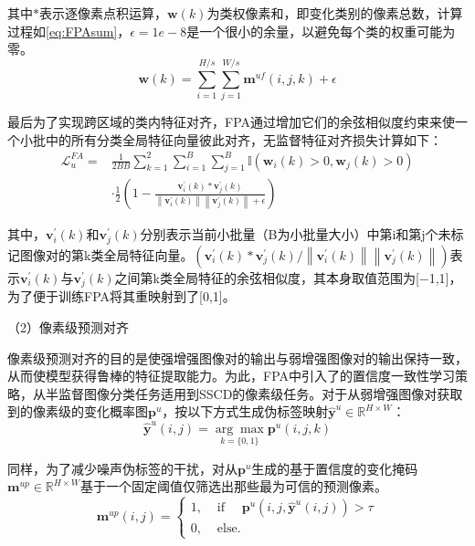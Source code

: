 \documentclass[lang=chs, degree=master, blindreview=false, adobe=false]{yanputhesis}
\begin{document}
其中$*$表示逐像素点积运算，$\boldsymbol{w}(k)$为类权像素和，即变化类别的像素总数，计算过程如\ref{eq:FPAsum}，$\epsilon = 1e-8$是一个很小的余量，以避免每个类的权重可能为零。
\begin{equation}
  \label{eq:FPAsum}
\boldsymbol{w}(k)=\sum_{i=1}^{H / s} \sum_{j=1}^{W / s} \mathbf{m}^{u f}(i, j, k)+\epsilon
\end{equation}

最后为了实现跨区域的类内特征对齐，FPA通过增加它们的余弦相似度约束来使一个小批中的所有分类全局特征向量彼此对齐，无监督特征对齐损失计算如下：
\begin{equation}
  \label{eq:FPALossf}
  \begin{aligned}
    \mathcal{L}_{u}^{F A}= & \frac{1}{2 B B} \sum_{k=1}^{2} \sum_{i=1}^{B} \sum_{j=1}^{B} \mathbb{I}\left(\boldsymbol{w}_{i}(k)>0, \boldsymbol{w}_{j}(k)>0\right) \\
    & \cdot \frac{1}{2}\left(1-\frac{\mathbf{v}_{i}^{\prime}(k) * \mathbf{v}_{j}^{\prime}(k)}{\left\|\mathbf{v}_{i}^{\prime}(k)\right\|\left\|\mathbf{v}_{j}^{\prime}(k)\right\|+\epsilon}\right)
    \end{aligned}
\end{equation}

其中，$\mathbf{v}_{i}^{\prime}(k)$和$\mathbf{v}_{j}^{\prime}(k)$分别表示当前小批量（B为小批量大小）中第i和第j个未标记图像对的第k类全局特征向量。$\left(\mathbf{v}_{i}^{\prime}(k) * \mathbf{v}_{j}^{\prime}(k) /\left\|\mathbf{v}_{i}^{\prime}(k)\right\|\left\|\mathbf{v}_{j}^{\prime}(k)\right\|\right)$表示$\mathbf{v}_{i}^{\prime}(k)$与$\mathbf{v}_{j}^{\prime}(k)$之间第k类全局特征的余弦相似度，其本身取值范围为[−1,1]，为了便于训练FPA将其重映射到了[0,1]。

（2）像素级预测对齐

像素级预测对齐的目的是使强增强图像对的输出与弱增强图像对的输出保持一致，从而使模型获得鲁棒的特征提取能力。为此，FPA中引入了\cite{sohn2020fixmatch}的置信度一致性学习策略，从半监督图像分类任务适用到SSCD的像素级任务。对于从弱增强图像对获取到的像素级的变化概率图$\mathbf{p}^{u}$，按以下方式生成伪标签映射$\hat{\mathbf{y}}^{u} \in \mathbb{R}^{H \times W}$：
\begin{equation}
  \label{eq:FPApesudo}
  \hat{\mathbf{y}}^{u}(i, j)=\underset{k=\{0,1\}}{\arg \max } \mathbf{p}^{u}(i, j, k)
\end{equation}

同样，为了减少噪声伪标签的干扰，对从$\mathbf{p}^{u}$生成的基于置信度的变化掩码$\mathbf{m}^{u p}\in \mathbb{R}^{H \times W}$基于一个固定阈值仅筛选出那些最为可信的预测像素。
\begin{equation}
  \label{eq:FPAfilter}
  \mathbf{m}^{u p}(i, j)=\left\{\begin{array}{ll}
    1, & \text { if } \quad \mathbf{p}^{u}\left(i, j, \hat{\mathbf{y}}^{u}(i, j)\right)>\tau \\
    0, & \text { else. }
    \end{array}\right.
\end{equation}
\end{document}
